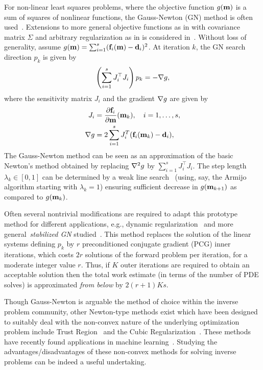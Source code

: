 For non-linear least squares problems, where the objective function $g({\bf m})$ is
a sum of squares of nonlinear functions, the Gauss-Newton (GN) method is often
used~\cite{sun2006optimization}.
Extensions to more general objective functions as in  with covariance matrix $ \Sigma $ and arbitrary regularization as in  is considered in~\cite{roszas}.
Without loss of generality, assume 
$g({\bf m}) = \sum_{i=1}^{s} ({\bf f}_{i}({\bf m}) - {\bf d}_{i})^{2}$.
At iteration $k$, the GN search direction $p_{k}$ is given by
\begin{equation} 
	\left( \sum_{i=1}^{s} {J}_{i}^{\top} {J}_{i} \right) p_{k}  = -\mathbf{\nabla} g,
\end{equation}
where the sensitivity matrix $J_i$ and the gradient $\mathbf{\nabla} g$ are given by
\begin{align}
	J_i &= \frac{\partial {\bf f}_{i}}{\partial {\bf m}}({\bf m}_{k}), \quad i = 1, \ldots , s,\\
	\mathbf{\nabla} g &= 2 \sum_{i=1}^s J_{i}^T({\bf f}_{i}({\bf m}_{k}) - {\bf d}_{i}),
\end{align}
The Gauss-Newton method can be seen as an approximation of the basic Newton's
method obtained by replacing $\mathbf{\nabla}^2 g$ by $\sum_{i=1}^{s} J_i^{\top} J_{i}$.
The step length $\lambda_{k} \in [0, 1]$ can be determined by a weak line
search~\cite{nocedal2006numerical} (using, say, the Armijo algorithm starting
with $\lambda_{k} = 1$) ensuring sufficient decrease in $g({\bf m}_{k+1})$ as
compared to $g({\bf m}_{k})$.

Often several nontrivial modifications are required to adapt this prototype method
for different applications, e.g., dynamic regularization~\cite{doas1,hanke1,rieder2005,rieder2010} and more general~\emph{stabilized GN} studied~\cite{rodoas1,doas12}.
This method replaces the solution of the linear systems defining $p_{k}$ by $r$
preconditioned conjugate gradient (PCG) inner iterations, which costs $2r$
solutions of the forward problem per iteration, for a moderate integer value $r$. 
Thus, if $K$ outer iterations are required to obtain an acceptable solution then
the total work estimate (in terms of the number of PDE solves) is approximated
{\em from below} by $2(r+1) K s$. 

Though Gauss-Newton is arguable the method of choice within the inverse problem community, other Newton-type methods exist which have been designed to suitably deal with the non-convex nature of the underlying optimization problem include Trust Region~\cite{conn2000trust,xu2017newton} and the Cubic Regularization~\cite{xu2017newton,cartis2012evaluation}. These methods have recently found applications in machine learning~\cite{xu2017second}. Studying the advantages/disadvantages of these non-convex methods for solving inverse problems can be indeed a useful undertaking.

